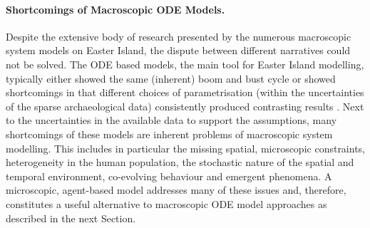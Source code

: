 \paragraph{Shortcomings of Macroscopic ODE Models.}
Despite the extensive body of research presented by the numerous macroscopic system models on Easter Island, the dispute between different narratives could not be solved.
The ODE based models, the main tool for Easter Island modelling, typically either showed the same (inherent) boom and bust cycle or showed shortcomings in that different choices of parametrisation (within the uncertainties of the sparse archaeological data) consistently produced contrasting results \citep{Merico2017}.
Next to the uncertainties in the available data to support the assumptions, many shortcomings of these models are inherent problems of macroscopic system modelling.
This includes in particular the missing spatial, microscopic constraints, heterogeneity in the human population, the stochastic nature of the spatial and temporal environment, co-evolving behaviour and emergent phenomena.
A microscopic, agent-based model addresses many of these issues and, therefore, constitutes a useful alternative to macroscopic ODE model approaches as described in the next Section.


\FloatBarrier
